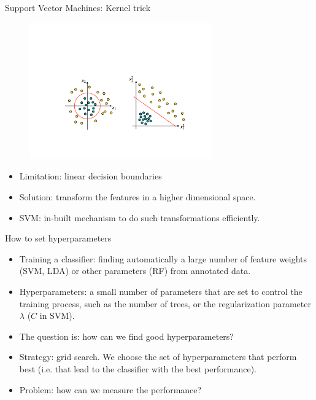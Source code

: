 \documentclass[xcolor=pdftex,dvipsnames,table]{beamer}
\begin{document}
\begin{frame}{Support Vector Machines: Kernel trick}
	\begin{figure}[htb]
		\includegraphics[width=0.7\textwidth]{../graphics/KernelTrick.pdf}
	\end{figure}
	\begin{itemize}
		\item Limitation: linear decision boundaries
		\item Solution: transform the features in a higher dimensional space. 
		\item SVM: in-built mechanism to do such transformations efficiently.
	\end{itemize}
\end{frame}


\begin{frame}{How to set hyperparameters}
	\begin{itemize}
		\item Training a classifier: finding automatically a large number of feature weights (SVM, LDA) or other parameters (RF) from annotated data.
		\item Hyperparameters: a small number of parameters that are set to control the training process, such as the number of trees, or the regularization parameter $\lambda$ ($C$ in SVM). 
		\item The question is: how can we find good hyperparameters?
		\item Strategy: grid search. We choose the set of hyperparameters that perform best (i.e. that lead to the classifier with the best performance).
		\item Problem: how can we measure the performance? 
	\end{itemize}
\end{frame}
\end{document}
